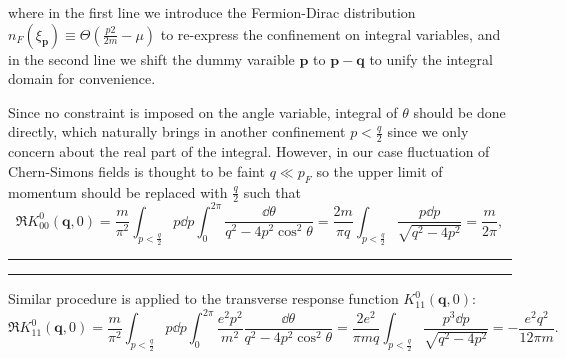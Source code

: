 \documentclass[bachelor,english,numbers]{ustcthesis}
\begin{document}
		where in the first line we introduce the Fermion-Dirac distribution $n_F(\xi_{\bm{p}})\equiv\varTheta(\frac{p2}{2m}-\mu)$ to re-express the confinement on integral variables, and in the second line we shift the dummy varaible $\bm{p}$ to $\bm{p-q}$ to unify the integral domain for convenience.\par
		Since no constraint is imposed on the angle variable, integral of $\theta$ should be done directly, which naturally brings in another confinement $p<\frac q 2$ since we only concern about the real part of the integral. However, in our case fluctuation of Chern-Simons fields is thought to be faint $q\ll p_F$ so the upper limit of momentum should be replaced with $\frac q 2$ such that
		\begin{equation}\label{3.2.3}
			\Re K^0_{00}(\bm{q},0)=\dfrac{m}{\pi^2}\int_{p<\frac q 2}p\dd p\int_0^{2\pi}\dfrac{\dd\theta}{q^2-4p^2\cos^2\theta}=\dfrac{2m}{\pi q}\int_{p<\frac q 2}\dfrac{p\dd p}{\sqrt{q^2-4p^2}}=\dfrac{m}{2\pi},
		\end{equation}
		
		\hrule
		\vspace{2pt}
		\hrule
		\vspace{1em}

		Similar procedure is applied to the transverse response function $K^0_{11}(\bm{q},0)$:
		\begin{equation}\label{3.2.4}
			\Re K^0_{11}(\bm{q},0)=\dfrac{m}{\pi^2}\int_{p<\frac q 2}p\dd p\int_0^{2\pi}\dfrac{e^2p^2}{m^2}\dfrac{\dd\theta}{q^2-4p^2\cos^2\theta}=\dfrac{2e^2}{\pi mq}\int_{p<\frac q 2}\dfrac{p^3\dd p}{\sqrt{q^2-4p^2}}=-\dfrac{e^2 q^2}{12\pi m}.
		\end{equation}
\end{document}
